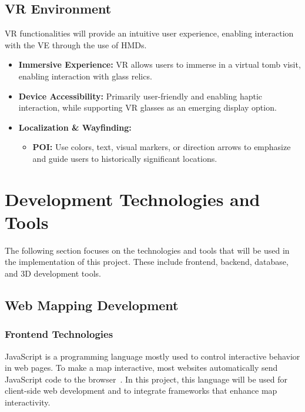 \subsection*{\gls{VR} Environment}
\gls{VR} functionalities will provide an intuitive user experience, enabling interaction with the \gls{VE} through the use of \glspl{HMD}.
\begin{itemize}
    \item \textbf{Immersive Experience:} \gls{VR} allows users to immerse in a virtual tomb visit, enabling interaction with glass relics.
    \item \textbf{Device Accessibility:} Primarily user-friendly and enabling haptic interaction, while supporting \gls{VR} glasses as an emerging display option.
    \item \textbf{Localization \& Wayfinding:} 
    \begin{itemize}
        \item \textbf{\gls{POI}:} Use colors, text, visual markers, or direction arrows to emphasize and guide users to historically significant locations.
    \end{itemize}
\end{itemize}

\section{Development Technologies and Tools}
\label{sec:technologies}

The following section focuses on the technologies and tools that will be used in the implementation of this project. These include frontend, backend, database, and \gls{3D} development tools.

\subsection{Web Mapping Development}

\subsubsection{Frontend Technologies}
\label{sec:frontend}

JavaScript is a programming language mostly used to control interactive behavior in web
pages. To make a map interactive, most websites automatically send JavaScript code to the browser~\cite{ajayi2024utilizing}. In this project, this language will be used for client-side web development and to integrate frameworks that enhance map interactivity.

